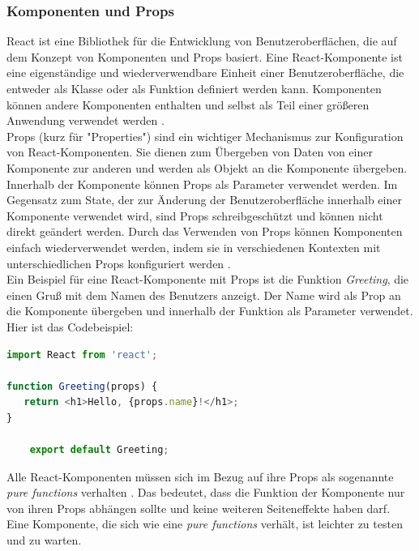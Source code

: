 \subsubsection{Komponenten und Props}
React ist eine Bibliothek für die Entwicklung von Benutzeroberflächen, die auf dem Konzept von Komponenten und Props basiert. Eine React-Komponente ist eine eigenständige und wiederverwendbare Einheit einer Benutzeroberfläche, die entweder als Klasse oder als Funktion definiert werden kann. Komponenten können andere Komponenten enthalten und selbst als Teil einer größeren Anwendung verwendet werden \cite{ReactComponentsAndProps}.\\
Props (kurz für "Properties") sind ein wichtiger Mechanismus zur Konfiguration von React-Komponenten. Sie dienen zum Übergeben von Daten von einer Komponente zur anderen und werden als Objekt an die Komponente übergeben. Innerhalb der Komponente können Props als Parameter verwendet werden. Im Gegensatz zum State, der zur Änderung der Benutzeroberfläche innerhalb einer Komponente verwendet wird, sind Props schreibgeschützt und können nicht direkt geändert werden. Durch das Verwenden von Props können Komponenten einfach wiederverwendet werden, indem sie in verschiedenen Kontexten mit unterschiedlichen Props konfiguriert werden \cite{ReactComponentsAndProps}.\\
Ein Beispiel für eine React-Komponente mit Props ist die Funktion \emph{Greeting}, die einen Gruß mit dem Namen des Benutzers anzeigt. Der Name wird als Prop an die Komponente übergeben und innerhalb der Funktion als Parameter verwendet. Hier ist das Codebeispiel:\\
\begin{lstlisting}[language=JavaScript,
	frame=single,           % Ein Rahmen um den Code
	framexleftmargin=15pt,  % Rahmen link von den Zahlen
	style=algoBericht,
	label={Props-Komponenten},
	captionpos=b ,          % Caption unter den Code setzen
	caption={Beispiel Kompoonente mit Probs in React}]
import React from 'react';
	
function Greeting(props) {
   return <h1>Hello, {props.name}!</h1>;
}
	
	export default Greeting;
\end{lstlisting}
\newpage
Alle React-Komponenten müssen sich im Bezug auf ihre Props als sogenannte \emph{pure functions} verhalten \cite{ReactComponentsAndProps}. Das bedeutet, dass die Funktion der Komponente nur von ihren Props abhängen sollte und keine weiteren Seiteneffekte haben darf. Eine Komponente, die sich wie eine \emph{pure functions} verhält, ist leichter zu testen und zu warten.\\
